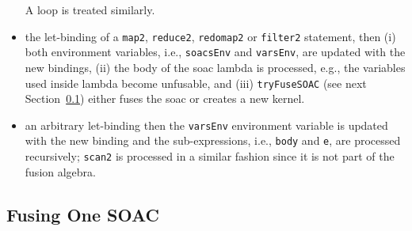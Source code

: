 \documentclass{sigplanconf}  %
\newcommand{\emp}[1]{\textcolor{DikuRed}{ #1}}
\begin{document}
\begin{itemize}
          A loop is treated similarly. 
    \item  the let-binding of a {\tt map2}, {\tt reduce2}, {\tt redomap2} or {\tt filter2} 
            statement, then (i) both environment variables, i.e., {\tt soacsEnv} and {\tt varsEnv}, 
            are updated with the new bindings, (ii) the body of the {\sc soac} 
            lambda is processed, e.g., the variables used inside lambda become unfusable,
            and (iii) \emp{{\tt tryFuseSOAC}} 
            (see next Section~\ref{sec:FusingOnce}) either fuses the {\sc soac} 
            or creates a new kernel. 
    \item an arbitrary let-binding then the {\tt varsEnv} environment variable is
            updated with the new binding and the sub-expressions, i.e., {\tt body} 
            and {\tt e}, are processed recursively; {\tt scan2} is processed
            in a similar fashion since it is not part of the fusion algebra. 
\end{itemize}


\subsection{Fusing One SOAC}
\label{sec:FusingOnce}
\end{document}
